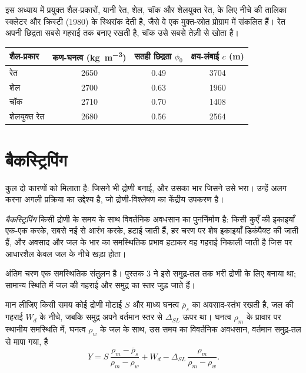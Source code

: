 इस अध्याय में प्रयुक्त शैल-प्रकारों, यानी रेत, शेल, चॉक और शेलयुक्त रेत, के लिए नीचे की तालिका
स्क्लेटर और क्रिस्टी (1980) के स्थिरांक देती है, जैसे वे एक मुक्त-स्रोत प्रोग्राम में संकलित हैं।
रेत अपनी छिद्रता सबसे गहराई तक बनाए रखती है, चॉक उसे सबसे तेज़ी से खोता है।

\begin{center}
\small
\begin{tabular}{lccc}
\hline
शैल-प्रकार & कण-घनत्व (\unit{kg.m^{-3}}) & सतही छिद्रता $\phi_0$ & क्षय-लंबाई $c$ (\unit{m}) \\
\hline
रेत & 2650 & 0.49 & 3704 \\
शेल & 2700 & 0.63 & 1960 \\
चॉक & 2710 & 0.70 & 1408 \\
शेलयुक्त रेत & 2680 & 0.56 & 2564 \\
\hline
\end{tabular}
\end{center}

\section{बैकस्ट्रिपिंग}\label{sec:b2:basins-compared:backstripping}

कुल  दो कारणों को मिलाता है: जिसने भी द्रोणी बनाई, और उसका भार जिसने उसे
भरा। उन्हें अलग करना अगली प्रक्रिया का उद्देश्य है, जो द्रोणी-विश्लेषण का
केंद्रीय उपकरण है।

\begin{definition}[बैकस्ट्रिपिंग]\label{def:b2:basins-compared:backstripping}
\emph{बैकस्ट्रिपिंग} किसी द्रोणी के समय के साथ विवर्तनिक अवधसान का
पुनर्निर्माण है: किसी कुएँ की इकाइयाँ एक-एक करके, सबसे नई से आरंभ करके, हटाई जाती हैं,
हर चरण पर शेष इकाइयाँ डिकंपैक्ट की जाती हैं, और अवसाद और जल के
भार का समस्थितिक प्रभाव हटाकर वह गहराई निकाली जाती है जिस पर आधारशैल केवल जल के नीचे खड़ा होता।
\end{definition}

अंतिम चरण एक समस्थितिक संतुलन है। पुस्तक 3 ने इसे समुद्र-तल तक भरी द्रोणी के लिए बनाया था;
सामान्य स्थिति में जल की गहराई और समुद्र का स्तर जुड़ जाते हैं।

\begin{proposition}[एयरी बैकस्ट्रिपिंग]\label{prop:b2:basins-compared:backstrip}
मान लीजिए किसी समय कोई द्रोणी मोटाई $S$ और माध्य घनत्व
$\bar\rho_s$ का अवसाद-स्तंभ रखती है, जल की गहराई $W_d$ के नीचे, जबकि समुद्र अपने वर्तमान स्तर से
$\Delta_{SL}$ ऊपर था। घनत्व $\rho_m$ के प्रावार पर स्थानीय समस्थिति में, घनत्व $\rho_w$ के जल के साथ,
उस समय का विवर्तनिक अवधसान, वर्तमान समुद्र-तल से मापा गया, है
\[
  Y = S\,\frac{\rho_m - \bar\rho_s}{\rho_m - \rho_w} + W_d
      - \Delta_{SL}\,\frac{\rho_m}{\rho_m - \rho_w}.
\]
\end{proposition}


